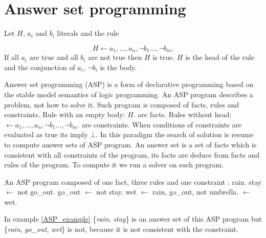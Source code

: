 \documentclass{aamas2012}
\begin{document}
\section{Answer set programming}

	\begin{definition}[Rule]
		Let $H$, $a_{i}$ and $b_{i}$ literals and the rule
	
					$$H \leftarrow a_{1}, \ldots , a_{n}, \neg b_{1} \ldots, \neg b_{m}.$$
		If all $a_{i}$ are true and all $b_{i}$ are not true then $H$ is true.
		$H$ is the head of the rule and the conjunction of $a_{i}$, $\neg b_{i}$ is the body.
	\end{definition}

	Answer set programming (ASP) is a form of declarative programming based on the stable model semantics of logic programming.
	An ASP program describes a problem, not how to solve it.
	Such program is composed of facts, rules and constraints. 
	Rule with an empty body: $H.$ are facts.
	Rules without head: $\leftarrow a_{1}, \ldots , a_{n}, \neg b_{1} \ldots, \neg b_{m}.$ are constraints.
	When conditions of constraints are evaluated as true its imply $\bot$.
	In this paradigm the search of solution is resume to compute answer sets of ASP program.
	An answer set is a set of facts which is consistent with all constraints of the program, its facts are deduce from facts and rules of the program.
	To compute it we run a solver on such program.
	
	\begin{example}
		\label{ASP_example}
		An ASP program composed of one fact, three rules and one constraint :\newline
		\newline
		rain.\newline
		stay $\leftarrow$ not go\_out.\newline
		go\_out $\leftarrow$ not stay.\newline
		wet $\leftarrow$ rain, go\_out, not umbrella.\newline
		$\leftarrow$ wet.
	\end{example}
	
	In example \ref{ASP_example} \{\emph{rain}, \emph{stay}\} is an answer set of this ASP program but \{\emph{rain}, \emph{go\_out}, \emph{wet}\} is not, 
	because it is not consistent with the constraint.
	
\end{document}
